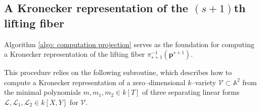 \documentclass[pdflatex,sn-basic]{sn-jnl}%
\theoremstyle{thmstyleone}%
\theoremstyle{thmstyletwo}%
\theoremstyle{thmstylethree}%
\theoremstyle{definition}
\numberwithin{equation}{section}
\newcommand{\bfs}{\boldsymbol}
\newcommand{\A}{\mathbb A}
\begin{document}
%
%
\subsection{A Kronecker representation of the $(s+1)$th lifting fiber}
%
Algorithm \ref{algo: computation projection} serves as the foundation
for computing a Kronecker representation of the lifting fiber
$\pi_{s+1}^{-1}(\bfs p^{s+1})$.
%

This procedure relies on the following subroutine, which describes
how to compute a Kronecker representation of a zero--dimensional
$k$--variety $\mathcal{V}\subset\A^2$ from the minimal polynomials
$m,m_1,m_2\in k[T]$ of three separating linear forms
$\mathcal{L},\mathcal{L}_1,\mathcal{L}_2\in k[X,Y]$ for
$\mathcal{V}$.
%
\end{document}
